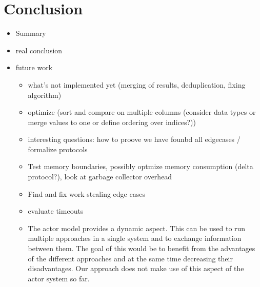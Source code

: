 
\section{Conclusion}\label{sec:conclusion}

\begin{itemize}
\item Summary
\item real conclusion
\item future work
\begin{itemize}
\item what's not implemented yet (merging of results, deduplication, fixing algorithm)
\item optimize (sort and compare on multiple columns (consider data types or merge values to one or define ordering over indices?))
\item interesting questions: how to proove we have founbd all edgecases / formalize protocols
\item Test memory boundaries, possibly optmize memory consumption (delta protocol?), look at garbage collector overhead
\item Find and fix work stealing edge cases 
\item evaluate timeouts
\item The actor model provides a dynamic aspect. 
This can be used to run multiple approaches in a single system and to exchange information between them. 
The goal of this would be to benefit from the advantages of the different approaches and at the same time decreasing their disadvantages.
Our approach does not make use of this aspect of the actor system so far.
\end{itemize}
\end{itemize}